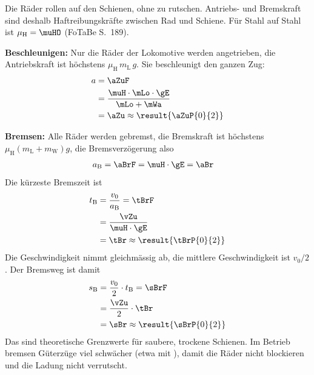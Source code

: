 \begin{center}
\end{center}

Die Räder rollen auf den Schienen, ohne zu rutschen. Antriebs- und Bremskraft sind deshalb Haftreibungskräfte zwischen Rad und Schiene. Für Stahl auf Stahl ist $\mu_\mathrm{H} = \muHO$ (FoTaBe S.~189).

\textbf{Beschleunigen:} Nur die Räder der Lokomotive werden angetrieben, die Antriebskraft ist höchstens $\mu_\mathrm{H}\,m_\mathrm{L}\,g$. Sie beschleunigt den ganzen Zug:
\begin{align}
 a &= \aZuF \\
   &= \frac{\muH\cdot\mLo\cdot\gE}{\mLo+\mWa} \\
   &= \aZu \approx \result{\aZuP{0}{2}}
\end{align}

\textbf{Bremsen:} Alle Räder werden gebremst, die Bremskraft ist höchstens $\mu_\mathrm{H}\left(m_\mathrm{L}+m_\mathrm{W}\right)g$, die Bremsverzögerung also
\begin{align}
 a_\mathrm{B} &= \aBrF = \muH\cdot\gE = \aBr
\end{align}
Die kürzeste Bremszeit ist
\begin{align}
 t_\mathrm{B} &= \frac{v_0}{a_\mathrm{B}} = \tBrF \\
   &= \frac{\vZu}{\muH\cdot\gE} \\
   &= \tBr \approx \result{\tBrP{0}{2}}
\end{align}
Die Geschwindigkeit nimmt gleichmässig ab, die mittlere Geschwindigkeit ist $v_0/2$. Der Bremsweg ist damit
\begin{align}
 s_\mathrm{B} &= \frac{v_0}{2}\cdot t_\mathrm{B} = \sBrF \\
   &= \frac{\vZu}{2}\cdot\tBr \\
   &= \sBr \approx \result{\sBrP{0}{2}}
\end{align}
Das sind theoretische Grenzwerte für saubere, trockene Schienen. Im Betrieb bremsen Güterzüge viel schwächer (etwa mit \aTyO), damit die Räder nicht blockieren und die Ladung nicht verrutscht.
